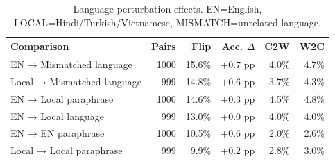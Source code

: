 \begin{table}[t]
\centering\footnotesize
\setlength{\tabcolsep}{5pt}
\begin{tabularx}{\textwidth}{Xrrrrr}
\toprule
Comparison & Pairs & Flip & Acc. $\Delta$ & C2W & W2C \\
\midrule
EN → Mismatched language & 1000 & 15.6\% & $+0.7$ pp & 4.0\% & 4.7\% \\
Local → Mismatched language & 999 & 14.8\% & $+0.6$ pp & 3.7\% & 4.3\% \\
EN → Local paraphrase & 1000 & 14.6\% & $+0.3$ pp & 4.5\% & 4.8\% \\
EN → Local language & 999 & 13.0\% & $+0.0$ pp & 4.0\% & 4.0\% \\
EN → EN paraphrase & 1000 & 10.5\% & $+0.6$ pp & 2.0\% & 2.6\% \\
Local → Local paraphrase & 999 & 9.9\% & $+0.2$ pp & 2.8\% & 3.0\% \\
\bottomrule
\end{tabularx}
\caption{Language perturbation effects. EN=English, LOCAL=Hindi/Turkish/Vietnamese, MISMATCH=unrelated language.}
\label{tab:language}
\end{table}
